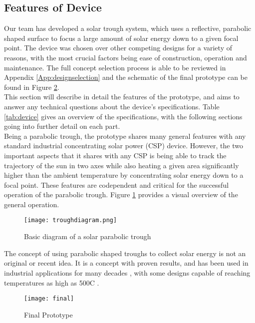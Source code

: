 \documentclass[11pt,english]{article}
\begin{document}
\subsection{Features of  Device}
 Our team has developed a solar trough system, which uses a reflective, parabolic shaped surface to focus a large amount of solar energy down to a given focal point. The device was chosen over other competing designs for a variety of reasons, with the most crucial factors being ease of construction, operation and maintenance. The full concept selection process is able to be reviewed in Appendix \ref{App:designselection} and the schematic of the final prototype can be found in Figure \ref{fig:finalproto}.\\
\noindent This section will describe in detail the features of the prototype, and aims to answer any technical questions about the device's specifications. Table \ref{tab:device} gives an overview of the specifications, with the following sections going into further detail on each part. \\  
 Being a parabolic trough, the prototype shares many general features with any standard industrial concentrating solar power (CSP) device. However, the two important aspects that it shares with any CSP is being able to track the trajectory of the sun in two axes while also heating a given area significantly higher than the ambient temperature by concentrating solar energy down to a focal point. These features are codependent and critical for the successful operation of the parabolic trough. Figure \ref{fig:troughdiagram} provides a visual overview of the general operation.\\ 
 \begin{figure}[ht!]
\centering
\texttt{[image: troughdiagram.png]}
\caption{Basic diagram of a solar parabolic trough \cite{conctrough}}
\label{fig:troughdiagram}
\end{figure}
\newpage


The concept of using parabolic shaped troughs to collect solar energy is not an original or recent idea. It is a concept with proven results, and has been used in industrial applications for many decades \citep{thomas1993parabolic}, with some designs capable of reaching temperatures as high as 500\degree C \cite{eusolaris}.
  \begin{figure}[ht!]
\centering
\texttt{[image: final]}
\caption{Final Prototype}
\label{fig:finalproto}
\end{figure}
 
\end{document}
